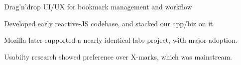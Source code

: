 \documentclass[letterpaper]{deedy-resume} %
\begin{document}
\begin{minipage}[t]{0.66\textwidth}
\sectionspace %



Drag'n'drop UI/UX for bookmark management and workflow
\vspace{\topsep} %
\begin{tightitemize}
\item Developed early reactive-JS codebase, and stacked our app/biz on it.
\item Mozilla later supported a nearly identical labs project, with major adoption.
\item Usabilty research showed preference over X-marks, which was mainstream.
\end{tightitemize}

\sectionspace %



\end{minipage} %


\newpage %
\end{document}

